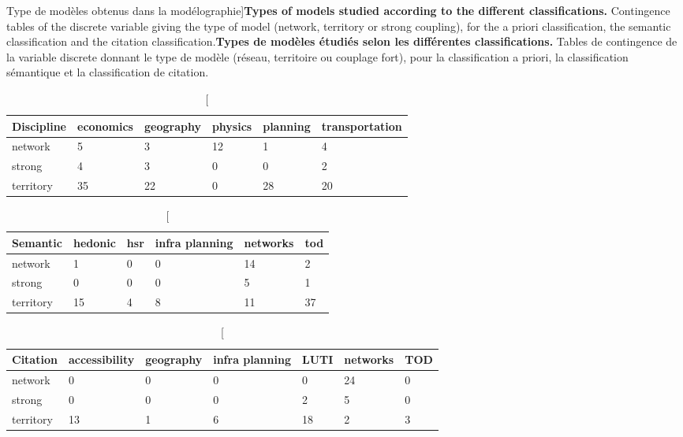 \begin{table}
\caption[Type of models obtained in the modelography][Type de modèles obtenus dans la modélographie]{\textbf{Types of models studied according to the different classifications.} Contingence tables of the discrete variable giving the type of model (network, territory or strong coupling), for the a priori classification, the semantic classification and the citation classification.\label{tab:modelography:what}}{\textbf{Types de modèles étudiés selon les différentes classifications.} Tables de contingence de la variable discrete donnant le type de modèle (réseau, territoire ou couplage fort), pour la classification a priori, la classification sémantique et la classification de citation.\label{tab:modelography:what}}
\begin{tabular}{|p{2.4cm}|p{2.4cm}p{2.4cm}p{2.4cm}p{2.4cm}p{2.4cm}|}
\hline
Discipline  &  economics & geography & physics & planning & transportation\\\hline
network     &     5      &      3    &   12    &    1     &         4  \\
strong      &     4      &     3     &   0     &   0      &        2  \\
territory   &    35      &    22     &   0     &    28    &         20 \\\hline  
\end{tabular} 
\medskip
\begin{tabular}{|p{2.4cm}|p{2.4cm}p{2.4cm}p{2.4cm}p{2.4cm}p{2.4cm}|}
\hline
Semantic  &  hedonic & hsr & infra planning & networks & tod\\\hline
network   &       1  & 0   &          0     &  14      & 2 \\
strong    &       0  &  0  &            0   &     5    & 1  \\
territory &      15  &  4  &            8   &    11    &  37 \\ \hline
\end{tabular}
\begin{tabular}{|p{2cm}|p{2cm}p{2cm}p{2cm}p{2cm}p{2cm}p{2cm}|}
\hline
Citation  &  accessibility & geography & infra planning & LUTI & networks & TOD \\\hline
network   &            0   &     0     &         0      &   0  &     24   &  0 \\
strong    &            0   &      0    &          0     &   2  &      5   &  0 \\
territory &           13   &      1    &          6     &  18  &      2   &  3 \\\hline
\end{tabular}
\end{table}



